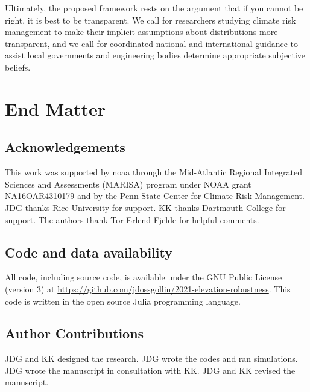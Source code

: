 \documentclass[11pt]{article}
\newcommand{\klaus}[1]{\todo[color=rosso, textcolor=grigio]{\textbf{ATTN Klaus:~}#1}}
\begin{document}
Ultimately, the proposed framework rests on the argument that if you cannot be right, it is best to be transparent.
We call for researchers studying climate risk management to make their implicit assumptions about  distributions more transparent, and we call for coordinated national and international guidance to assist local governments and engineering bodies determine appropriate subjective beliefs.\klaus{OK with this?}

\section*{End Matter}

\subsection*{Acknowledgements}

This work was supported by \acrfull{noaa} through the Mid-Atlantic Regional Integrated Sciences and Assessments (MARISA) program under NOAA grant NA16OAR4310179 and by the Penn State Center for Climate Risk Management.
JDG thanks Rice University for support.
KK thanks Dartmouth College for support.
The authors thank Tor Erlend Fjelde for helpful comments.

\subsection*{Code and data availability}

All code, including source code, is available under the GNU Public License (version 3) at \url{https://github.com/jdossgollin/2021-elevation-robustness}.
This code is written in the open source Julia programming language.

\subsection*{Author Contributions}

JDG and KK designed the research.
JDG wrote the codes and ran simulations.
JDG wrote the manuscript in consultation with KK.
JDG and KK revised the manuscript.

\printbibliography

\appendix
\newcommand{\hbAppendixPrefix}{S}
\renewcommand{\thefigure}{\hbAppendixPrefix\arabic{figure}}
\setcounter{figure}{0}
\renewcommand{\thetable}{\hbAppendixPrefix\arabic{table}}
\setcounter{table}{0}
\renewcommand{\theequation}{\hbAppendixPrefix\arabic{equation}}
\setcounter{equation}{0}
\end{document}
